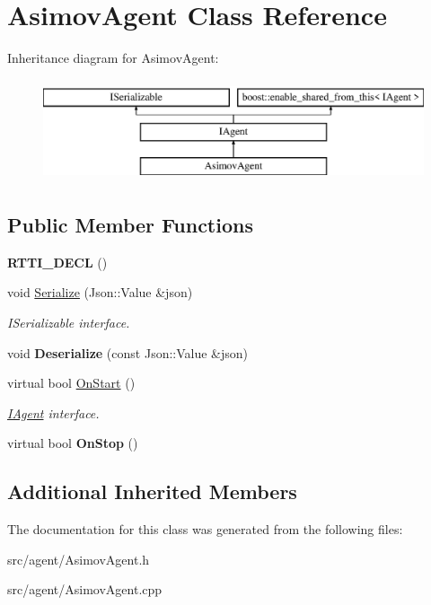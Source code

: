 \hypertarget{class_asimov_agent}{}\section{Asimov\+Agent Class Reference}
\label{class_asimov_agent}
Inheritance diagram for Asimov\+Agent\+:\begin{figure}[H]
\begin{center}
\leavevmode
\includegraphics[height=3.000000cm]{class_asimov_agent}
\end{center}
\end{figure}
\subsection*{Public Member Functions}
\begin{DoxyCompactItemize}
\item 
\mbox{\label{class_asimov_agent_a423266b1f0892bc41a7acd106a7c757e}} 
{\bfseries R\+T\+T\+I\+\_\+\+D\+E\+CL} ()
\item 
\mbox{\label{class_asimov_agent_a523ddb43c7be34525b42ca61c5c02085}} 
void \hyperlink{class_asimov_agent_a523ddb43c7be34525b42ca61c5c02085}{Serialize} (Json\+::\+Value \&json)
\begin{DoxyCompactList}\small\item\em I\+Serializable interface. \end{DoxyCompactList}\item 
\mbox{\label{class_asimov_agent_add1619cbc6d2af8c46bd2b2bdc6dff24}} 
void {\bfseries Deserialize} (const Json\+::\+Value \&json)
\item 
\mbox{\label{class_asimov_agent_a1603d40f0b82dabd59821c82345b8868}} 
virtual bool \hyperlink{class_asimov_agent_a1603d40f0b82dabd59821c82345b8868}{On\+Start} ()
\begin{DoxyCompactList}\small\item\em \hyperlink{class_i_agent}{I\+Agent} interface. \end{DoxyCompactList}\item 
\mbox{\label{class_asimov_agent_a83a0eb629e37f30960da7623bf9acb58}} 
virtual bool {\bfseries On\+Stop} ()
\end{DoxyCompactItemize}
\subsection*{Additional Inherited Members}


The documentation for this class was generated from the following files\+:\begin{DoxyCompactItemize}
\item 
src/agent/Asimov\+Agent.\+h\item 
src/agent/Asimov\+Agent.\+cpp\end{DoxyCompactItemize}
